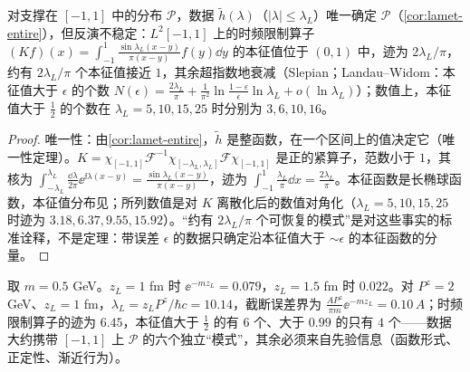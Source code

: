 \begin{proposition}\label{prop:lamet-slepian}
对支撑在 $[-1,1]$ 中的分布 $\mathcal P$，数据 $\tilde h(\lambda)$（$|\lambda|\le\lambda_L$）唯一确定 $\mathcal P$（\cref{cor:lamet-entire}），但反演不稳定：$L^2[-1,1]$ 上的时频限制算子 $(Kf)(x)=\int_{-1}^1\frac{\sin\lambda_L(x-y)}{\pi(x-y)}f(y)\dd y$ 的本征值位于 $(0,1)$ 中，迹为 $2\lambda_L/\pi$，约有 $2\lambda_L/\pi$ 个本征值接近 $1$，其余超指数地衰减（Slepian\cite{SlepianPollak1961}；Landau--Widom\cite{LandauWidom1980}：本征值大于 $\epsilon$ 的个数 $N(\epsilon)=\frac{2\lambda_L}\pi+\frac1{\pi^2}\ln\frac{1-\epsilon}\epsilon\ln\lambda_L+o(\ln\lambda_L)$）；数值上，本征值大于 $\frac12$ 的个数在 $\lambda_L=5,10,15,25$ 时分别为 $3,6,10,16$。%
\end{proposition}

\begin{proof}
唯一性：由\cref{cor:lamet-entire}，$\tilde h$ 是整函数，在一个区间上的值决定它（唯一性定理）。$K=\chi_{[-1,1]}\mathcal F^{-1}\chi_{[-\lambda_L,\lambda_L]}\mathcal F\chi_{[-1,1]}$ 是正的紧算子，范数小于 $1$，其核为 $\int_{-\lambda_L}^{\lambda_L}\frac{\dd\lambda}{2\pi}\ee^{\ii\lambda(x-y)}=\frac{\sin\lambda_L(x-y)}{\pi(x-y)}$，迹为 $\int_{-1}^1\frac{\lambda_L}\pi\dd x=\frac{2\lambda_L}\pi$。本征函数是长椭球函数，本征值分布见\cite{SlepianPollak1961,LandauWidom1980}；所列数值是对 $K$ 离散化后的数值对角化（$\lambda_L=5,10,15,25$ 时迹为 $3.18,6.37,9.55,15.92$）。“约有 $2\lambda_L/\pi$ 个可恢复的模式”是对这些事实的标准诠释，不是定理：带误差 $\epsilon$ 的数据只确定沿本征值大于 $\sim\epsilon$ 的本征函数的分量。
\end{proof}

\begin{example}[截断误差与可恢复模式数的数值]\label{ex:lamet-fourier-numbers}
取 $m=0.5$ GeV。$z_L=1$ fm 时 $\ee^{-mz_L}=0.079$，$z_L=1.5$ fm 时 $0.022$。对 $P^z=2$ GeV、$z_L=1$ fm，$\lambda_L=z_LP^z/\hbar c=10.14$，截断误差界为 $\frac{AP^z}{\pi m}\ee^{-mz_L}=0.10\,A$；时频限制算子的迹为 $6.45$，本征值大于 $\frac12$ 的有 $6$ 个、大于 $0.99$ 的只有 $4$ 个——数据大约携带 $[-1,1]$ 上 $\mathcal P$ 的六个独立“模式”，其余必须来自先验信息（函数形式、正定性、渐近行为）。
\end{example}

